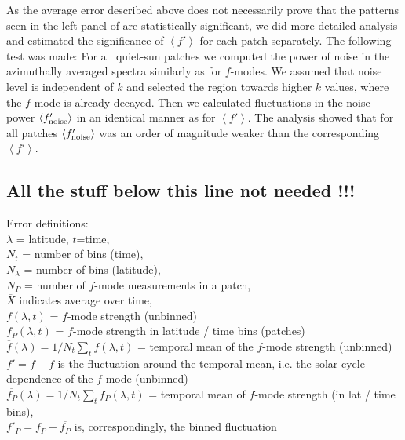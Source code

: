 \documentclass{aa}
\begin{document}
As the average error described above does not necessarily prove that the patterns seen in the left panel of  are statistically significant, we did more detailed analysis and estimated the significance of $\left< f' \right>$ for each patch separately. The following test was made: For all quiet-sun patches we computed the power of noise in the azimuthally averaged spectra similarly as for $f$-modes. We assumed that noise level is independent of $k$ and selected the region towards higher $k$ values, where the $f$-mode is already decayed. Then we calculated fluctuations in the noise power $\left< f'_{\rm noise} \right>$ in an identical manner as for $\left< f' \right>$.
The analysis showed that for all patches $\left< f'_{\rm noise} \right>$ was an order of magnitude weaker than the corresponding $\left< f' \right>$.

\color{cyan}
\subsection*{All the stuff below this line not needed !!!}
Error definitions:\\
$\lambda$ = latitude, $t$=time, \\
$N_t$ = number of bins (time), \\
$N_\lambda$ = number of bins (latitude), \\
$N_P$ = number of $f$-mode measurements in a patch, \\
$\overline{X}$ indicates average over time, \\
$f(\lambda,t)$ = $f$-mode strength (unbinned)\\
$f_P(\lambda,t)$ = $f$-mode strength in latitude / time bins (patches)\\
$\overline{f}(\lambda) = 1/N_t \sum_t f(\lambda,t)$ = temporal mean of the $f$-mode strength (unbinned)\\ 
$f'=f-\overline{f}$ is the fluctuation around the temporal mean, i.e. the solar cycle dependence of the $f$-mode (unbinned)\\
$\overline{f_P}(\lambda) = 1/N_t \sum_t f_P(\lambda,t)$ = temporal mean of 
$f$-mode strength (in lat / time bins), \\
$f'_P=f_P-\overline{f_P}$ is, correspondingly, the binned fluctuation\\
\end{document}
